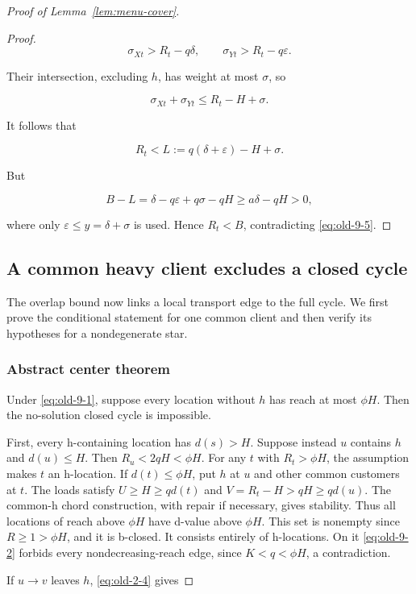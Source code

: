 \documentclass[11pt]{amsart}
\numberwithin{equation}{section}
\theoremstyle{definition}
\begin{document}
\begin{proof}[Proof of Lemma~\ref{lem:menu-cover}]
\begin{proof}
\[
\sigma_{Xt}>R_t-q\delta,\qquad \sigma_{Yt}>R_t-q\varepsilon.
\]

Their intersection, excluding \(h\), has weight at most \(\sigma\), so

\[
\sigma_{Xt}+\sigma_{Yt}\le R_t-H+\sigma.
\]

It follows that

\[
R_t<L:=q(\delta+\varepsilon)-H+\sigma.
\]

But

\[
B-L=\delta-q\varepsilon+q\sigma-qH
\ge a\delta-qH>0,
\]

where only \(\varepsilon\le y=\delta+\sigma\) is used. Hence \(R_t<B\), contradicting \eqref{eq:old-9-5}. \end{proof}


\subsection{A common heavy client excludes a closed cycle}\label{abstract-center-theorem-and-nondegenerate-stars}
The overlap bound now links a local transport edge to the full cycle. We first prove the conditional statement for one common client and then verify its hypotheses for a nondegenerate star.



\subsubsection{Abstract center theorem}\label{abstract-center-theorem}

Under \eqref{eq:old-9-1}, suppose every location without \(h\) has reach at most \(\phi H\). Then the no-solution closed cycle is impossible.

First, every h-containing location has \(d(s)>H\). Suppose instead \(u\) contains \(h\) and \(d(u)\le H\). Then \(R_u<2qH<\phi H\). For any \(t\) with \(R_t>\phi H\), the assumption makes \(t\) an h-location. If \(d(t)\le\phi H\), put \(h\) at \(u\) and other common customers at \(t\). The loads satisfy \(U\ge H\ge qd(t)\) and \(V=R_t-H>qH\ge qd(u)\). The common-h chord construction, with repair if necessary, gives stability. Thus all locations of reach above \(\phi H\) have d-value above \(\phi H\). This set is nonempty since \(R\ge1>\phi H\), and it is b-closed. It consists entirely of h-locations. On it \eqref{eq:old-9-2} forbids every nondecreasing-reach edge, since \(K<q<\phi H\), a contradiction.

If \(u\to v\) leaves \(h\), \eqref{eq:old-2-4} gives


\end{proof}
\end{document}
